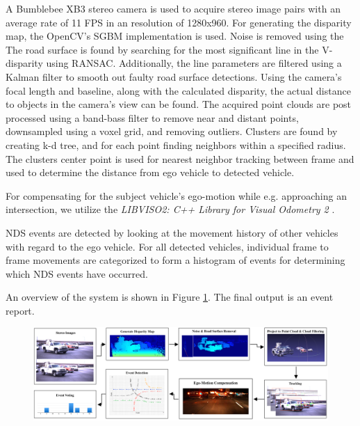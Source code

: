 \begin{multicols}{2}   
A Bumblebee XB3 stereo camera is used to acquire stereo image pairs with an average rate of 11 FPS in an resolution of 1280x960.  
For generating the disparity map, the OpenCV's SGBM\cite{HirschmullerRLandSGBM} implementation is used.
Noise is removed using the
The road surface is found by searching for the most significant line in the V-disparity\cite{labayrade2002real} using RANSAC. Additionally, the line parameters are filtered using a Kalman filter to smooth out faulty road surface detections. 
Using the camera's focal length and baseline, along with the calculated disparity, the actual distance to objects in the camera's view can be found. %
The acquired point clouds are post processed using a band-bass filter to remove near and distant points, downsampled using a voxel grid, and removing outliers. Clusters are found by creating k-d tree, and for each point finding neighbors within a specified radius. The clusters center point is used for nearest neighbor tracking between frame and used to determine the distance from ego vehicle to detected vehicle.

For compensating for the subject vehicle's ego-motion while e.g. approaching an intersection, we utilize the \textit{LIBVISO2: C++ Library for Visual Odometry 2} \cite{Geiger2011IV}. 

NDS events are detected by looking at the movement history of other vehicles with regard to the ego vehicle. For all detected vehicles, individual frame to frame movements are categorized to form a histogram of events for determining which NDS events have occurred. 

An overview of the system is shown in Figure \ref{systemOverview::systemOverview}. The final output is an event report.
\end{multicols}
\vspace*{-5mm}
\begin{figure}[H]
  \centering
  \includegraphics[width=1\textwidth]{text/figures/methods/intersectionDay/allInOne.png}
  \label{systemOverview::systemOverview}
\end{figure}


